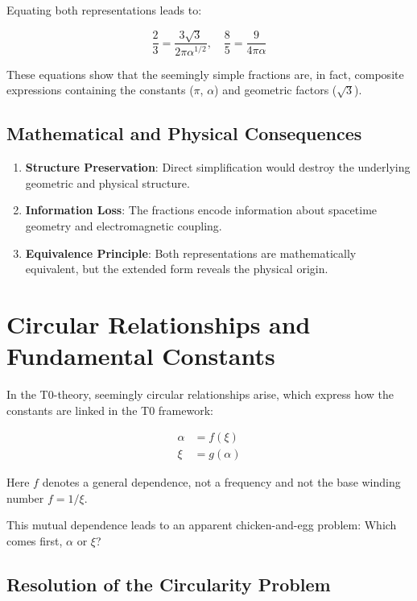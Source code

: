 	Equating both representations leads to:
	
	\[
	\frac{2}{3} = \frac{3\sqrt{3}}{2\pi\alpha^{1/2}}, \quad \frac{8}{5} = \frac{9}{4\pi\alpha}
	\]
	
	These equations show that the seemingly simple fractions are, in fact, composite expressions containing the constants (\(\pi\), \(\alpha\)) and geometric factors (\(\sqrt{3}\)).
	
	\subsection*{Mathematical and Physical Consequences}
	
	\begin{enumerate}
		\item \textbf{Structure Preservation}: Direct simplification would destroy the underlying geometric and physical structure.
		
		\item \textbf{Information Loss}: The fractions encode information about spacetime geometry and electromagnetic coupling.
		
		\item \textbf{Equivalence Principle}: Both representations are mathematically equivalent, but the extended form reveals the physical origin.
	\end{enumerate}
	
	\section{Circular Relationships and Fundamental Constants}
	\label{sec:circular}
	
	In the T0-theory, seemingly circular relationships arise, which express how the constants are linked in the T0 framework:
	
	\begin{align*}
		\alpha &= f(\xi) \\
		\xi &= g(\alpha)
	\end{align*}

Here $f$ denotes a general dependence, not a frequency and not the base winding number $f = 1/\xi$.

	This mutual dependence leads to an apparent chicken-and-egg problem: Which comes first, \(\alpha\) or \(\xi\)?
	
	\subsection{Resolution of the Circularity Problem}
	

